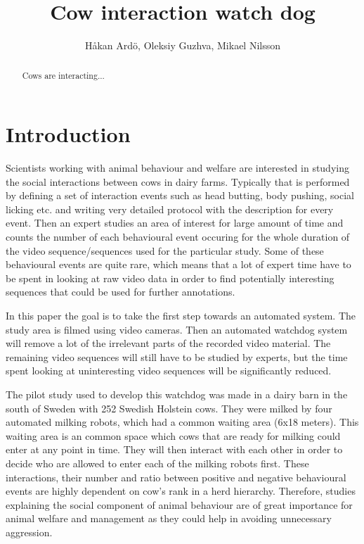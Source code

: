 \documentclass[10pt,a4paper,twocolumn]{article}
\author{Håkan Ardö, Oleksiy Guzhva, Mikael Nilsson}
\title{Cow interaction watch dog}
\begin{document}
\maketitle

\begin{abstract}
Cows are interacting...
\end{abstract}

\section{Introduction}

Scientists working with animal behaviour and welfare are interested in studying the social interactions between cows in dairy farms. Typically that is performed by defining a set of interaction events such as head butting, body pushing, social licking etc. and writing very detailed protocol with the description for every event. Then an expert studies an area of interest for large amount of time and counts the number of each behavioural event occuring for the whole duration of the video sequence/sequences used for the particular study. Some of these behavioural events are quite rare, which means that a lot of expert time have to be spent in looking at raw video data in order to find potentially interesting sequences that could be used for further annotations.

In this paper the goal is to take the first step towards an automated system. The study area is filmed using video cameras. Then an automated watchdog system will remove a lot of the irrelevant parts of the recorded video material. The remaining video sequences will still have to be studied by experts, but the time spent looking at uninteresting video sequences will be significantly reduced.

The pilot study used to develop this watchdog was made in a dairy barn in the south of Sweden with 252 Swedish Holstein cows. They were milked by four automated milking robots, which had a common waiting area (6x18 meters). This waiting area is an common space which cows that are ready for milking could enter at any point in time. They will then interact with each other  in order to decide who are allowed to enter each of the milking robots first. These interactions, their number and ratio between positive and negative behavioural events are highly dependent on cow's rank in a herd hierarchy. Therefore, studies explaining the social component of animal behaviour are of great importance for animal welfare and management as they could help in avoiding unnecessary aggression.
\end{document}
